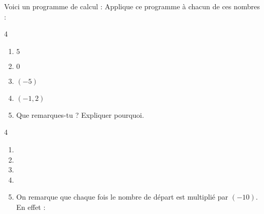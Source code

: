 \begin{exercice*}
    Voici un programme de calcul :
    Applique ce programme à chacun de ces nombres :
    \begin{multicols}4
        \begin{enumerate}
            \item $ 5 $
            \item $ 0 $
            \item $ (-5) $
            \item $ (-1,2) $
        \end{enumerate}
    \end{multicols}
    \begin{enumerate}
        \setcounter{enumi}{4}
        \item Que remarques-tu ? Expliquer pourquoi.
    \end{enumerate}
        
\end{exercice*}
\begin{corrige}
    \phantom{rrr}    
    \begin{multicols}4
        \begin{enumerate}
            \item {}            
            \item {}            
            \item {}            
            \item {}
        \end{enumerate}
    \end{multicols}
        \begin{enumerate}
            \setcounter{enumi}{4}
            \item On remarque que chaque fois le nombre de départ est multiplié par $(-10)$. En effet :
        \end{enumerate}
\end{corrige}